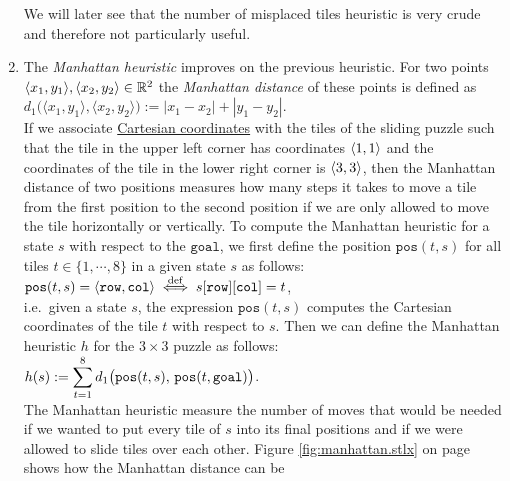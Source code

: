 \begin{enumerate}
      We will later see that the number of misplaced tiles heuristic is very crude and therefore not
      particularly useful.
\item The \emph{\color{blue}Manhattan heuristic} improves on the previous heuristic.  For two points 
      $\pair(x_1, y_1), \pair(x_2, y_2) \in \mathbb{R}^2$ the \emph{\color{blue}Manhattan distance} of these
      points is defined as 
      \\[0.2cm]
      \hspace*{1.3cm}
      $d_1\bigl(\langle x_1, y_1\rangle, \langle x_2, y_2\rangle\bigr) := |x_1 - x_2| + |y_1 - y_2|$.
      \\[0.2cm]
      If we associate \href{https://en.wikipedia.org/wiki/Cartesian_coordinate_system}{Cartesian coordinates} with
      the tiles of the sliding puzzle such that the tile in the upper left corner has coordinates
      $\pair(1, 1)$ and the coordinates of the tile in the lower right corner is $\pair(3, 3)$, then
      the Manhattan distance of two positions measures how many steps it takes to move a tile from
      the first position to the second position if we are only allowed to move the tile horizontally
      or vertically.  To compute the Manhattan heuristic for a state $s$ with respect to the
      $\mathtt{goal}$, we first define the position $\mathtt{pos}(t, s)$ for all tiles 
      $t \in \{1,\cdots, 8\}$ in a given state $s$ as follows:
      \\[0.2cm]
      \hspace*{1.3cm}
      $\mathtt{pos}(t, s) = \pair(\mathtt{row}, \mathtt{col}) 
         \;\stackrel{\mathrm{def}}{\Longleftrightarrow}\; s[\mathtt{row}][\mathtt{col}] = t
      $,
      \\[0.2cm]
      i.e.~given a state $s$, the expression $\mathtt{pos}(t, s)$ computes the Cartesian coordinates of
      the tile $t$ with respect to $s$.  Then we can define the Manhattan heuristic $h$ for the $3 \times 3$ puzzle
      as follows:  
      \\[0.2cm]
      \hspace*{1.3cm}
      $\displaystyle h(s) := \sum\limits_{t=1}^8 d_1\bigl(\mathtt{pos}(t,s),\, \mathtt{pos}(t, \mathtt{goal})\bigr)$.
      \\[0.2cm]
      The Manhattan heuristic measure the number of moves that would be needed if we wanted to put every tile
      of $s$ into its final positions and if we were allowed to slide tiles over each other.  Figure
      \ref{fig:manhattan.stlx} on page \pageref{fig:manhattan.stlx} shows how the Manhattan distance can be

\end{enumerate}
